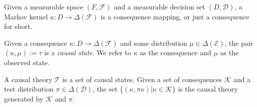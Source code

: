 \begin{definition}[Consequences]
Given a measurable space $(F,\mathcal{F})$ and a measurable decision set $(D,\mathcal{D})$, a Markov kernel $\kappa:D \to \Delta(\mathcal{F})$ is a consequence mapping, or just a consequence for short.
\end{definition}

\begin{definition}
Given a consequence $\kappa:D\to \Delta(\mathcal{F})$ and some distribution $\mu\in \Delta(\mathcal{E})$, the pair $(\kappa,\mu):=\tau$ is a \emph{causal state}. We refer to $\kappa$ as the consequence and $\mu$ as the observed state.
\end{definition}

\begin{definition}\label{def:causal_theory}
A causal theory $\mathscr{T}$ is a set of causal states. Given a set of consequences $\mathscr{K}$ and a test distribution $\pi\in \Delta(\mathcal{D})$, the set $\{(\kappa,\pi\kappa)|\kappa\in \mathscr{K}\}$ is the causal theory generated by $\mathscr{K}$ and $\pi$.
\end{definition}


